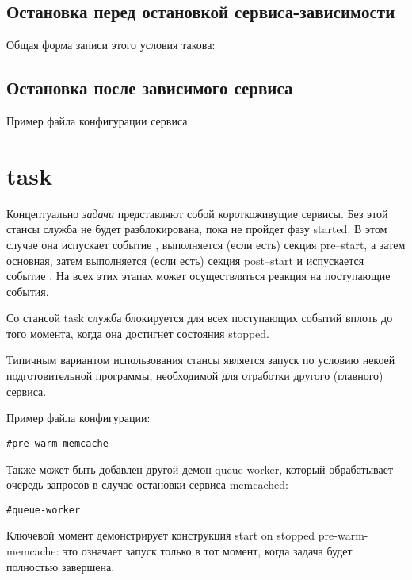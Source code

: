 \subsection{Остановка перед остановкой сервиса-зависимости}
Общая форма записи этого условия такова: \begin{alltt}
\end{alltt}
\subsection{Остановка после зависимого сервиса}
Пример файла конфигурации сервиса: \begin{alltt}
\end{alltt}
\section{task}
Концептуально \textit{задачи} представляют собой короткоживущие сервисы. Без этой стансы служба не будет разблокирована, пока не пройдет фазу started. В этом случае она испускает событие , выполняется (если есть) секция pre--start, а затем основная, затем выполняется (если есть) секция post--start и испускается событие . На всех этих этапах может осуществляться реакция на поступающие события.

Со стансой task служба блокируется для всех поступающих событий вплоть до того момента, когда она достигнет состояния stopped.

Типичным вариантом использования стансы является запуск по условию некоей подготовительной программы, необходимой для отработки другого (главного) сервиса.

Пример файла конфигурации: \begin{alltt}
# pre-warm-memcache
\end{alltt} 
Также может быть добавлен другой демон queue-worker, который обрабатывает очередь запросов в случае остановки сервиса memcached: \begin{alltt}
# queue-worker
\end{alltt} 
Ключевой момент демонстрирует конструкция start on stopped pre-warm-memcache: это означает запуск только в тот момент, когда задача будет полностью завершена.
